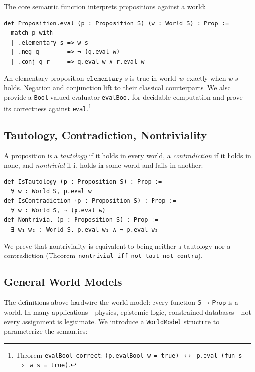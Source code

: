 \documentclass[10pt, letterpaper]{article}
\theoremstyle{definition}
\theoremstyle{remark}
\newcommand{\Sach}{\mathsf{S}}
\newcommand{\Prop}{\mathsf{Prop}}
\begin{document}
The core semantic function interprets propositions against a
world:

\begin{lstlisting}
def Proposition.eval (p : Proposition S) (w : World S) : Prop :=
  match p with
  | .elementary s => w s
  | .neg q        => ¬ (q.eval w)
  | .conj q r     => q.eval w ∧ r.eval w
\end{lstlisting}

\noindent
An elementary proposition $\mathtt{elementary}\;s$ is true in
world~$w$ exactly when $w\;s$ holds.  Negation and conjunction
lift to their classical counterparts.  We also provide a
\texttt{Bool}-valued evaluator \texttt{evalBool} for decidable
computation and prove its correctness against
\texttt{eval}.\footnote{Theorem \texttt{evalBool\_correct}:
\texttt{(p.evalBool w = true) $\leftrightarrow$ p.eval
(fun s $\Rightarrow$ w s = true)}.}

\subsection{Tautology, Contradiction, Nontriviality}
\label{sec:tautology}

A proposition is a \emph{tautology} if it holds in every world,
a \emph{contradiction} if it holds in none, and
\emph{nontrivial} if it holds in some world and fails in
another:

\begin{lstlisting}
def IsTautology (p : Proposition S) : Prop :=
  ∀ w : World S, p.eval w
def IsContradiction (p : Proposition S) : Prop :=
  ∀ w : World S, ¬ (p.eval w)
def Nontrivial (p : Proposition S) : Prop :=
  ∃ w₁ w₂ : World S, p.eval w₁ ∧ ¬ p.eval w₂
\end{lstlisting}

\noindent
We prove that nontriviality is equivalent to being neither a
tautology nor a contradiction
(Theorem~\texttt{nontrivial\_iff\_not\_taut\_not\_contra}).

\subsection{General World Models}
\label{sec:worldmodel}

The definitions above hardwire the world model: every function
$\Sach \to \Prop$ is a world.  In many applications---physics,
epistemic logic, constrained databases---not every assignment is
legitimate.  We introduce a \texttt{WorldModel} structure to
parameterize the semantics:
\end{document}
